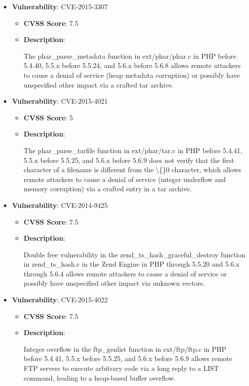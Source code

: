 \documentclass{article}
\begin{document}
\begin{itemize}
        \item \textbf{Vulnerability}: CVE-2015-3307
        \begin{itemize}
            \item \textbf{CVSS Score}:  7.5 
            \item \textbf{Description}:
            \parbox[t]{0.9\linewidth}{
                \ttfamily The phar\_parse\_metadata function in ext/phar/phar.c in PHP before 5.4.40, 5.5.x before 5.5.24, and 5.6.x before 5.6.8 allows remote attackers to cause a denial of service (heap metadata corruption) or possibly have unspecified other impact via a crafted tar archive.
            }
        \end{itemize}
    
        \item \textbf{Vulnerability}: CVE-2015-4021
        \begin{itemize}
            \item \textbf{CVSS Score}:  5 
            \item \textbf{Description}:
            \parbox[t]{0.9\linewidth}{
                \ttfamily The phar\_parse\_tarfile function in ext/phar/tar.c in PHP before 5.4.41, 5.5.x before 5.5.25, and 5.6.x before 5.6.9 does not verify that the first character of a filename is different from the \textbackslash\{\}0 character, which allows remote attackers to cause a denial of service (integer underflow and memory corruption) via a crafted entry in a tar archive.
            }
        \end{itemize}
    
        \item \textbf{Vulnerability}: CVE-2014-9425
        \begin{itemize}
            \item \textbf{CVSS Score}:  7.5 
            \item \textbf{Description}:
            \parbox[t]{0.9\linewidth}{
                \ttfamily Double free vulnerability in the zend\_ts\_hash\_graceful\_destroy function in zend\_ts\_hash.c in the Zend Engine in PHP through 5.5.20 and 5.6.x through 5.6.4 allows remote attackers to cause a denial of service or possibly have unspecified other impact via unknown vectors.
            }
        \end{itemize}
    
        \item \textbf{Vulnerability}: CVE-2015-4022
        \begin{itemize}
            \item \textbf{CVSS Score}:  7.5 
            \item \textbf{Description}:
            \parbox[t]{0.9\linewidth}{
                \ttfamily Integer overflow in the ftp\_genlist function in ext/ftp/ftp.c in PHP before 5.4.41, 5.5.x before 5.5.25, and 5.6.x before 5.6.9 allows remote FTP servers to execute arbitrary code via a long reply to a LIST command, leading to a heap-based buffer overflow.
            }
        \end{itemize}
    

\end{itemize}
\end{document}
